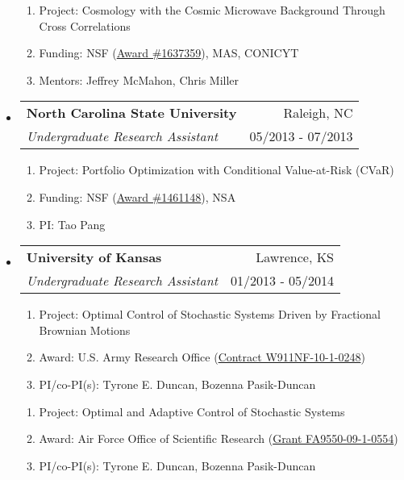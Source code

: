 \documentclass[letterpaper,10pt]{article}
\makeatletter
\newcommand{\subheadingtwo}[4]{
\begin{tabular*}{6.45in}{l@{\cftdotfill{\cftsecdotsep}\extracolsep{\fill}}r}
\textbf{#1} & #2 \\
#3 & {#4} \\
\end{tabular*}}
\makeatother
\begin{document}
\begin{itemize}[leftmargin=0.4cm]
\begin{enumerate}[leftmargin=0.5cm]
	\setlength\itemsep{-0.05ex}
	\item[] Project: Cosmology with the Cosmic Microwave Background Through Cross Correlations
	\item[] Funding: NSF (\href{https://www.nsf.gov/awardsearch/showAward?AWD_ID=1637359&HistoricalAwards=false}{Award \#1637359}), MAS, CONICYT
	\item[] Mentors: Jeffrey McMahon, Chris Miller
\end{enumerate}


\vspace{0.1cm}


\item[] \subheadingtwo{North Carolina State University}{Raleigh, NC}{\it Undergraduate Research Assistant}{05/2013 - 07/2013}

\begin{enumerate}[leftmargin=0.5cm]
	\setlength\itemsep{-0.05ex}
	\item[] Project: Portfolio Optimization with Conditional Value-at-Risk (CVaR)
	\item[] Funding: NSF (\href{https://www.nsf.gov/awardsearch/showAward?AWD_ID=1461148&HistoricalAwards=false}{Award \#1461148}), NSA
	\item[] PI: Tao Pang
\end{enumerate}


\vspace{0.2cm}


\item[] \subheadingtwo{University of Kansas}{Lawrence, KS}{\it Undergraduate Research Assistant}{01/2013 - 05/2014}

\begin{enumerate}[leftmargin=0.5cm]
	\setlength\itemsep{-0.05ex}
	\item[] Project: Optimal Control of Stochastic Systems Driven by Fractional Brownian Motions
	\item[] Award: U.S. Army Research Office (\href{http://www.dtic.mil/dtic/tr/fulltext/u2/a614716.pdf}{Contract W911NF-10-1-0248})
	\item[] PI/co-PI(s): Tyrone E. Duncan, Bozenna Pasik-Duncan
\end{enumerate}


\begin{enumerate}[leftmargin=0.5cm]
	\setlength\itemsep{-0.05ex}
	\item[] Project: Optimal and Adaptive Control of Stochastic Systems
	\item[] Award: Air Force Office of Scientific Research (\href{http://www.dtic.mil/dtic/tr/fulltext/u2/a567576.pdf}{Grant FA9550-09-1-0554})
	\item[] PI/co-PI(s): Tyrone E. Duncan, Bozenna Pasik-Duncan
\end{enumerate}



\end{itemize}
\end{document}
